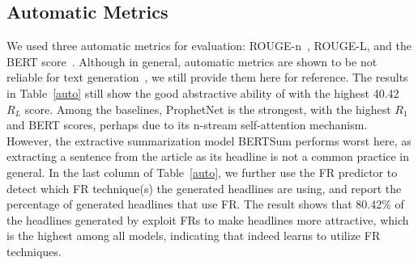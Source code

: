 

\subsection{Automatic Metrics}
We used three automatic metrics for evaluation:
\mbox{ROUGE-n}~\cite{lin-2004-rouge}, ROUGE-L, and the BERT
score~\cite{bert-score}. Although in general, automatic metrics are shown to be not
reliable for text
generation~\cite{sulem-etal-2018-bleu,callison-burch-etal-2006-evaluating,schluter-2017-limits,wang-etal-2018-metrics},
we still provide them here for reference. The results in Table~\ref{auto} still
show the good abstractive ability of \modelname with the highest 40.42 $R_L$
score. Among the baselines, ProphetNet is the strongest, with the highest $R_1$
and BERT scores, perhaps due to its n-stream self-attention mechanism. 
However, the extractive summarization model BERTSum performs worst
here, as extracting a sentence from the article as its headline is not a common
practice in general. 
In the last column of Table~\ref{auto}, we further use the FR predictor to
detect which FR technique(s) the generated headlines are using, and report the
percentage of generated headlines that use FR. The result shows that 80.42\% of
the headlines generated by \modelname exploit FRs to make headlines more
attractive, which is the highest among all models, indicating that \modelname
indeed learns to utilize FR techniques. 
  

